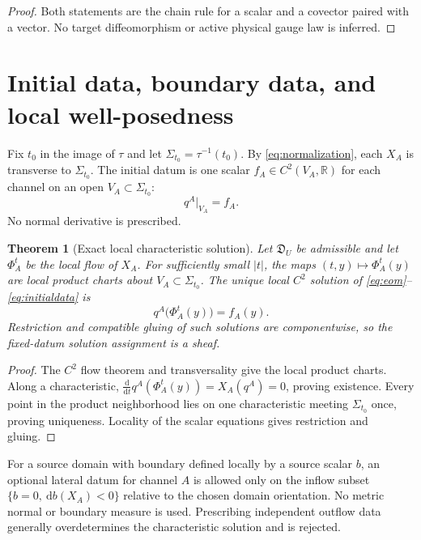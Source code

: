 \documentclass[11pt]{article}
\newcommand{\D}{\mathfrak D}
\newcommand{\R}{\mathbb R}
\newcommand{\dd}{\mathrm d}
\newtheorem{theorem}{Theorem}
\begin{document}
\begin{proof}
Both statements are the chain rule for a scalar and a covector paired with a
vector.  No target diffeomorphism or active physical gauge law is inferred.
\end{proof}

\section{Initial data, boundary data, and local well-posedness}

Fix $t_0$ in the image of $\tau$ and let
$\Sigma_{t_0}=\tau^{-1}(t_0)$.  By \eqref{eq:normalization}, each $X_A$ is
transverse to $\Sigma_{t_0}$.  The initial datum is one scalar
$f_A\in C^2(V_A,\R)$ for each channel on an open
$V_A\subset\Sigma_{t_0}$:
\begin{equation}
  q^A|_{V_A}=f_A.
  \label{eq:initialdata}
\end{equation}
No normal derivative is prescribed.

\begin{theorem}[Exact local characteristic solution]
Let $\D_U$ be admissible and let $\Phi_A^t$ be the local flow of $X_A$.
For sufficiently small $|t|$, the maps
$(t,y)\mapsto\Phi_A^t(y)$ are local product charts about
$V_A\subset\Sigma_{t_0}$.  The unique local $C^2$ solution of
\eqref{eq:eom}--\eqref{eq:initialdata} is
\begin{equation}
  q^A\bigl(\Phi_A^t(y)\bigr)=f_A(y).
  \label{eq:flowsolution}
\end{equation}
Restriction and compatible gluing of such solutions are componentwise, so
the fixed-datum solution assignment is a sheaf.
\end{theorem}

\begin{proof}
The $C^2$ flow theorem and transversality give the local product charts.
Along a characteristic,
$\frac{\dd}{\dd t}q^A(\Phi_A^t(y))=X_A(q^A)=0$, proving existence.
Every point in the product neighborhood lies on one characteristic meeting
$\Sigma_{t_0}$ once, proving uniqueness.  Locality of the scalar equations
gives restriction and gluing.
\end{proof}

For a source domain with boundary defined locally by a source scalar $b$, an
optional lateral datum for channel $A$ is allowed only on the inflow subset
$\{b=0,\ \dd b(X_A)<0\}$ relative to the chosen domain orientation.  No
metric normal or boundary measure is used.  Prescribing independent outflow
data generally overdetermines the characteristic solution and is rejected.
\end{document}
